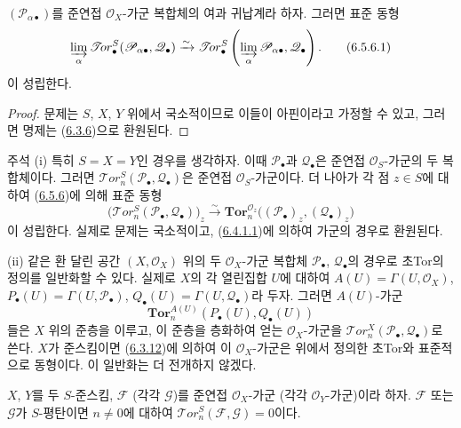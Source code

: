\begin{proposition}[6.5.6]
\label{III.6.5.6-fr}
$(\mathscr P_{\alpha\bullet})$를 준연접 $\mathscr O_X$-가군 복합체의
여과 귀납계라 하자. 그러면 표준 동형
\[
  \varinjlim_\alpha
  \mathscr{T}\!or_\bullet^S
  (\mathscr P_{\alpha\bullet},\mathscr Q_\bullet)
  \xrightarrow{\sim}
  \mathscr{T}\!or_\bullet^S
  \left(\varinjlim_\alpha\mathscr P_{\alpha\bullet},\mathscr Q_\bullet\right).
  \tag{6.5.6.1}\label{III.6.5.6.1.fr}
\]
이 성립한다.
\end{proposition}

\begin{proof}
문제는 $S$, $X$, $Y$ 위에서 국소적이므로 이들이 아핀이라고 가정할
수 있고, 그러면 명제는 (\hyperref[III.6.3.6-fr]{6.3.6})으로 환원된다.
\end{proof}

\begin{namedtheorem}[6.5.7]{주석}
\label{III.6.5.7-fr}
\textnormal{(i)} 특히 $S=X=Y$인 경우를 생각하자. 이때
$\mathscr P_\bullet$과 $\mathscr Q_\bullet$은 준연접
$\mathscr O_S$-가군의 두 복합체이다. 그러면
$\mathscr{T}\!or_n^S(\mathscr P_\bullet,\mathscr Q_\bullet)$은 준연접
$\mathscr O_S$-가군이다. 더 나아가 각 점 $z\in S$에 대하여
(\hyperref[III.6.5.6-fr]{6.5.6})에 의해 표준 동형
\[
  \bigl(\mathscr{T}\!or_n^S
    (\mathscr P_\bullet,\mathscr Q_\bullet)\bigr)_z
  \xrightarrow{\sim}
  \mathbf{Tor}_n^{\mathscr O_z}
  \bigl((\mathscr P_\bullet)_z,(\mathscr Q_\bullet)_z\bigr)
  \tag{6.5.7.1}\label{III.6.5.7.1.fr}
\]
이 성립한다. 실제로 문제는 국소적이고,
(\hyperref[III.6.4.1.1.fr]{6.4.1.1})에 의하여 가군의 경우로 환원된다.

\textnormal{(ii)} 같은 환 달린 공간 $(X,\mathscr O_X)$ 위의 두
$\mathscr O_X$-가군 복합체 $\mathscr P_\bullet$,
$\mathscr Q_\bullet$의 경우로 초Tor의 정의를 일반화할 수 있다. 실제로
$X$의 각 열린집합 $U$에 대하여
$A(U)=\Gamma(U,\mathscr O_X)$,
$P_\bullet(U)=\Gamma(U,\mathscr P_\bullet)$,
$Q_\bullet(U)=\Gamma(U,\mathscr Q_\bullet)$라 두자. 그러면 $A(U)$-가군
\[
  \mathbf{Tor}_n^{A(U)}(P_\bullet(U),Q_\bullet(U))
\]
들은 $X$ 위의 준층을 이루고, 이 준층을 층화하여 얻는
$\mathscr O_X$-가군을
$\mathscr{T}\!or_n^X(\mathscr P_\bullet,\mathscr Q_\bullet)$로 쓴다.
$X$가 준스킴이면 (\hyperref[III.6.3.12-fr]{6.3.12})에 의하여 이
$\mathscr O_X$-가군은 위에서 정의한 초Tor와 표준적으로 동형이다.
이 일반화는 더 전개하지 않겠다.
\end{namedtheorem}

\begin{proposition}[6.5.8]
\label{III.6.5.8-fr}
$X$, $Y$를 두 $S$-준스킴, $\mathscr F$ (각각 $\mathscr G$)를 준연접
$\mathscr O_X$-가군 (각각 $\mathscr O_Y$-가군)이라 하자.
$\mathscr F$ 또는 $\mathscr G$가 $S$-평탄이면 $n\neq0$에 대하여
$\mathscr{T}\!or_n^S(\mathscr F,\mathscr G)=0$이다.
\end{proposition}

